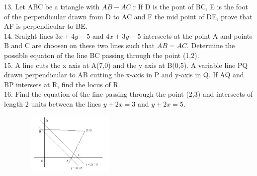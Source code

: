 \documentclass[12pt]{article}
\begin{document}
13. Let ABC be a triangle with $AB-AC$.r If D is the pont of BC, E is the foot of the perpendicular drawn from D to AC and F the mid point of DE, prove that AF is perpendicular to BE.\\
14. Sraight lines $3x+4y-5$ and $4x+3y-5$ intersects at the point A and points B and C 
are choosen on these two lines such that $AB=AC$. Determine the possible equaton of the line BC passing through the point (1,2).\\
15. A line cuts the x axis at A(7,0) and the y axis at B(0,5). A variable line PQ drawn perpendicular to AB cutting the x-axis  in P and y-axis in Q. If AQ and BP intersets at R, find the locus of R.\\
16. Find the equation of the line passing through the point (2,3) and intersects of length 2 units between the lines $y+2x=3$ and $y+2x=5$.\\
 
\begin{figure}[h]
\centering
    \includegraphics[width=5cm, height=3cm]{fig.png}
    
    

\end{figure}
\end{document}
